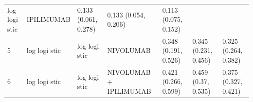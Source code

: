 \documentclass[
]{article}
\begin{document}
\begin{longtable}[]{@{}lllllll@{}}
\begin{minipage}[t]{0.08\columnwidth}
log logi stic\strut
\end{minipage} & \begin{minipage}[t]{0.15\columnwidth}\raggedright
IPILIMUMAB\strut
\end{minipage} & \begin{minipage}[t]{0.15\columnwidth}\raggedright
0.133 (0.061, 0.278)\strut
\end{minipage} & \begin{minipage}[t]{0.15\columnwidth}\raggedright
0.133 (0.054, 0.206)\strut
\end{minipage} & \begin{minipage}[t]{0.16\columnwidth}\raggedright
0.113 (0.075, 0.152)\strut
\end{minipage}\tabularnewline
\begin{minipage}[t]{0.04\columnwidth}\raggedright
5\strut
\end{minipage} & \begin{minipage}[t]{0.08\columnwidth}\raggedright
log logi stic\strut
\end{minipage} & \begin{minipage}[t]{0.08\columnwidth}\raggedright
log logi stic\strut
\end{minipage} & \begin{minipage}[t]{0.15\columnwidth}\raggedright
NIVOLUMAB\strut
\end{minipage} & \begin{minipage}[t]{0.15\columnwidth}\raggedright
0.348 (0.191, 0.526)\strut
\end{minipage} & \begin{minipage}[t]{0.15\columnwidth}\raggedright
0.345 (0.231, 0.456)\strut
\end{minipage} & \begin{minipage}[t]{0.16\columnwidth}\raggedright
0.325 (0.264, 0.382)\strut
\end{minipage}\tabularnewline
\begin{minipage}[t]{0.04\columnwidth}\raggedright
6\strut
\end{minipage} & \begin{minipage}[t]{0.08\columnwidth}\raggedright
log logi stic\strut
\end{minipage} & \begin{minipage}[t]{0.08\columnwidth}\raggedright
log logi stic\strut
\end{minipage} & \begin{minipage}[t]{0.15\columnwidth}\raggedright
NIVOLUMAB + IPILIMUMAB\strut
\end{minipage} & \begin{minipage}[t]{0.15\columnwidth}\raggedright
0.421 (0.266, 0.599)\strut
\end{minipage} & \begin{minipage}[t]{0.15\columnwidth}\raggedright
0.459 (0.37, 0.535)\strut
\end{minipage} & \begin{minipage}[t]{0.16\columnwidth}\raggedright
0.375 (0.327, 0.421)\strut
\end{minipage}\tabularnewline
\bottomrule
\end{longtable}
\end{document}
